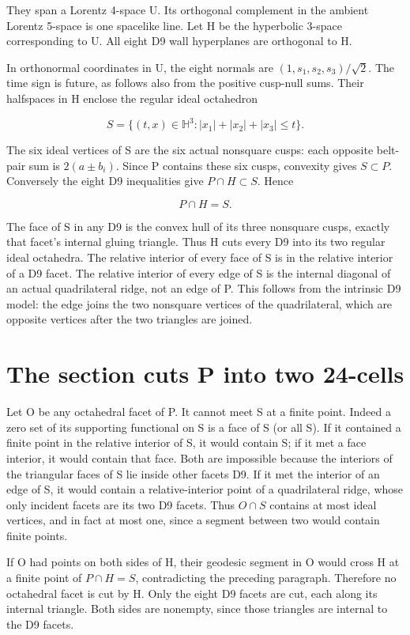 \documentclass[11pt]{article}
\begin{document}
They span a Lorentz 4-space U. Its orthogonal complement in the ambient Lorentz 5-space is one spacelike line. Let H be the hyperbolic 3-space corresponding to U. All eight D9 wall hyperplanes are orthogonal to H.

In orthonormal coordinates in U, the eight normals are \((1,s_1,s_2,s_3)/\sqrt2\). The time sign is future, as follows also from the positive cusp-null sums. Their halfspaces in H enclose the regular ideal octahedron

\[
 S=\{(t,x)\in\mathbb H^3:|x_1|+|x_2|+|x_3|\le t\}.
\]

The six ideal vertices of S are the six actual nonsquare cusps: each opposite belt-pair sum is \(2(a\pm b_i)\). Since P contains these six cusps, convexity gives \(S\subset P\). Conversely the eight D9 inequalities give \(P\cap H\subset S\). Hence

\[
 P\cap H=S. \tag{6}
\]

The face of S in any D9 is the convex hull of its three nonsquare cusps, exactly that facet's internal gluing triangle. Thus H cuts every D9 into its two regular ideal octahedra. The relative interior of every face of S is in the relative interior of a D9 facet. The relative interior of every edge of S is the internal diagonal of an actual quadrilateral ridge, not an edge of P. This follows from the intrinsic D9 model: the edge joins the two nonsquare vertices of the quadrilateral, which are opposite vertices after the two triangles are joined.

\section{The section cuts P into two 24-cells}\label{the-section-cuts-p-into-two-24-cells}

Let O be any octahedral facet of P. It cannot meet S at a finite point. Indeed a zero set of its supporting functional on S is a face of S (or all S). If it contained a finite point in the relative interior of S, it would contain S; if it met a face interior, it would contain that face. Both are impossible because the interiors of the triangular faces of S lie inside other facets D9. If it met the interior of an edge of S, it would contain a relative-interior point of a quadrilateral ridge, whose only incident facets are its two D9 facets. Thus \(O\cap S\) contains at most ideal vertices, and in fact at most one, since a segment between two would contain finite points.

If O had points on both sides of H, their geodesic segment in O would cross H at a finite point of \(P\cap H=S\), contradicting the preceding paragraph. Therefore no octahedral facet is cut by H. Only the eight D9 facets are cut, each along its internal triangle. Both sides are nonempty, since those triangles are internal to the D9 facets.
\end{document}
